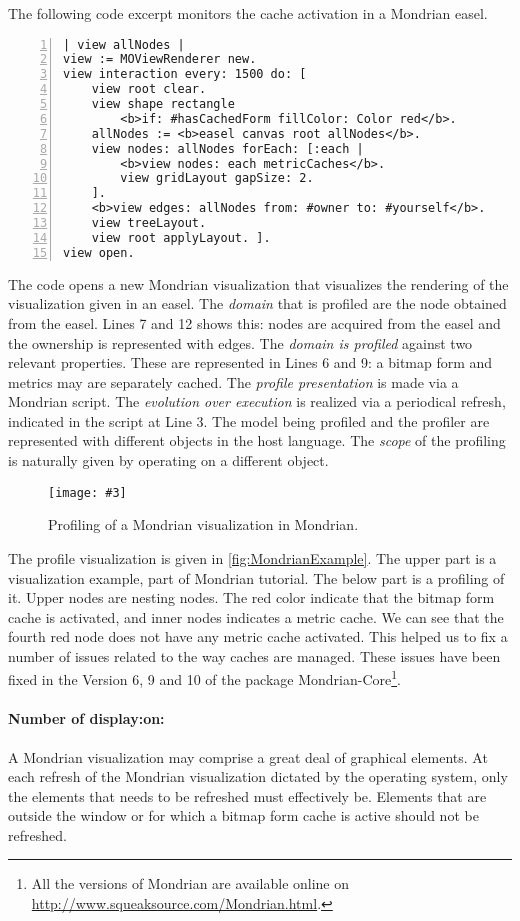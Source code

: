 \documentclass[runningheads]{llncs}
\newcommand{\fig}[4]{
	\begin{figure}[#1]
		\centering
		\texttt{[image: \#3]}
		\caption{\label{fig:#3}#4}
	\end{figure}}
\begin{document}
The following code excerpt monitors the cache activation in a Mondrian easel.

\begin{lstlisting}[numbers=left]
| view allNodes |
view := MOViewRenderer new.
view interaction every: 1500 do: [
	view root clear.
	view shape rectangle
		<b>if: #hasCachedForm fillColor: Color red</b>.
	allNodes := <b>easel canvas root allNodes</b>.
	view nodes: allNodes forEach: [:each |
		<b>view nodes: each metricCaches</b>.
		view gridLayout gapSize: 2.
	].  
	<b>view edges: allNodes from: #owner to: #yourself</b>.
	view treeLayout.
	view root applyLayout. ].	
view open.
\end{lstlisting}

The code opens a new Mondrian visualization that visualizes the rendering of the visualization given in an easel. The \emph{domain} that is profiled are the node obtained from the easel. Lines 7 and 12 shows this: nodes are acquired from the easel and the ownership is represented with edges. The \emph{domain is profiled} against two relevant properties. These are represented in Lines 6 and 9: a bitmap form and metrics may are separately cached. The \emph{profile presentation} is made via a Mondrian script. The \emph{evolution over execution} is realized via a periodical refresh, indicated in the script at Line 3. The model being profiled and the profiler are represented with different objects in the host language. The \emph{scope} of the profiling is naturally given by operating on a different object.

\fig{}{.8}{MondrianExample}{Profiling of a Mondrian visualization in Mondrian.}

The profile visualization is given in \autoref{fig:MondrianExample}. The upper part is a visualization example, part of Mondrian tutorial. The below part is a profiling of it. Upper nodes are nesting nodes. The red color indicate that the bitmap form cache is activated, and inner nodes indicates a metric cache. We can see that the fourth red node does not have any metric cache activated. This helped us to fix a number of issues related to the way caches are managed. These issues have been fixed in the Version 6, 9 and 10 of the package Mondrian-Core\footnote{All the versions of Mondrian are available online on \url{http://www.squeaksource.com/Mondrian.html}.}.

\paragraph{Number of display:on:}
A Mondrian visualization may comprise a great deal of graphical elements. At each refresh of the Mondrian visualization dictated by the operating system, only the elements that needs to be refreshed must effectively be. Elements that are outside the window or for which a bitmap form cache is active should not be refreshed. 
\end{document}
